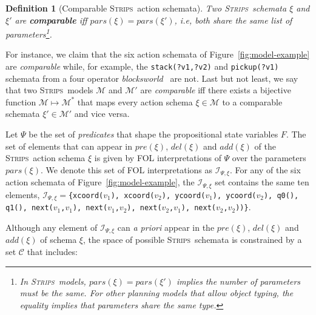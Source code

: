 \documentclass[letterpaper]{article} %
\newcommand{\strips}{\textsc{Strips}}     %
\newtheorem{definition}[theorem]{Definition}
\begin{document}
\begin{definition}[Comparable \strips\ action schemata]
Two \strips\ schemata $\xi$ and $\xi'$ are {\bf comparable} iff $pars(\xi)=pars(\xi')$, i.e, both share the same list of parameters\footnote{In \strips\ models, $pars(\xi)=pars(\xi')$ implies the number of parameters must be the same. For other planning models that allow object typing, the equality implies that parameters share the same type.}.
\end{definition}

For instance, we claim that the six action schemata of Figure~\ref{fig:model-example} are {\em comparable} while, for example, the {\small\tt stack(?v1,?v2)} and {\small\tt pickup(?v1)} schemata from a four operator {\em blocksworld}~\cite{slaney2001blocks} are not. Last but not least, we say that two \strips\ models $\mathcal{M}$ and $\mathcal{M}'$ are {\em comparable} iff there exists a bijective function $\mathcal{M} \mapsto \mathcal{M}^*$ that maps every action schema $\xi\in\mathcal{M}$ to a comparable schemata $\xi'\in\mathcal{M'}$ and vice versa.

Let $\Psi$ be the set of {\em predicates} that shape the propositional state variables $F$. The set of elements that can appear in $pre(\xi)$, $del(\xi)$ and $add(\xi)$ of the \strips\ action schema $\xi$ is given by FOL interpretations of $\Psi$ over the parameters $pars(\xi)$. We denote this set of FOL interpretations as ${\mathcal I}_{\Psi,\xi}$. For any of the six action schemata of Figure~\ref{fig:model-example}, the ${\mathcal I}_{\Psi,\xi}$ set contains the same ten elements, ${\mathcal I}_{\Psi,\xi}=${\small\tt\{xcoord($v_1$), xcoord($v_2$), ycoord($v_1$), ycoord($v_2$), q0(), q1(), next($v_1$,$v_1$), next($v_1$,$v_2$), next($v_2$,$v_1$), next($v_2$,$v_2$))\}}.

Although any element of ${\mathcal I}_{\Psi,\xi}$ can {\em a priori} appear in the $pre(\xi)$, $del(\xi)$ and $add(\xi)$ of schema $\xi$, the space of possible \strips\ schemata is constrained by a set ${\mathcal C}$ that includes:
\end{document}
